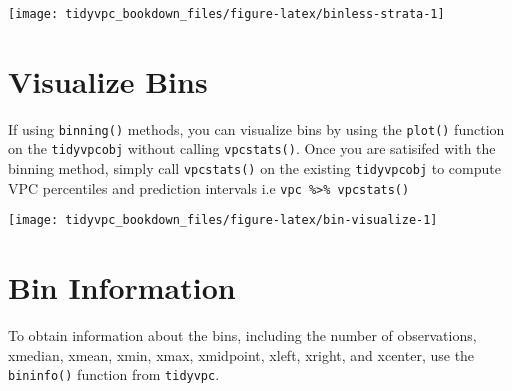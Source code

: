\documentclass[
]{book}
\newenvironment{Shaded}{\begin{snugshade}}{\end{snugshade}}
\newcommand{\DataTypeTok}[1]{\textcolor[rgb]{0.13,0.29,0.53}{#1}}
\newcommand{\DecValTok}[1]{\textcolor[rgb]{0.00,0.00,0.81}{#1}}
\newcommand{\KeywordTok}[1]{\textcolor[rgb]{0.13,0.29,0.53}{\textbf{#1}}}
\newcommand{\NormalTok}[1]{#1}
\newcommand{\OperatorTok}[1]{\textcolor[rgb]{0.81,0.36,0.00}{\textbf{#1}}}
\newcommand{\StringTok}[1]{\textcolor[rgb]{0.31,0.60,0.02}{#1}}
\begin{document}
\texttt{[image: tidyvpc\_bookdown\_files/figure-latex/binless-strata-1]}

\hypertarget{visualize-bins}{%
\section{Visualize Bins}\label{visualize-bins}}

If using \texttt{binning()} methods, you can visualize bins by using the \texttt{plot()} function on the \texttt{tidyvpcobj} without calling \texttt{vpcstats()}. Once you are satisifed with the binning method, simply call \texttt{vpcstats()} on the existing \texttt{tidyvpcobj} to compute VPC percentiles and prediction intervals i.e \texttt{vpc\ \%\textgreater{}\%\ vpcstats()}

\begin{Shaded}
\end{Shaded}

\texttt{[image: tidyvpc\_bookdown\_files/figure-latex/bin-visualize-1]}

\hypertarget{bin-information}{%
\section{Bin Information}\label{bin-information}}

To obtain information about the bins, including the number of observations, xmedian, xmean, xmin, xmax, xmidpoint, xleft, xright, and xcenter, use the \texttt{bininfo()} function from \texttt{tidyvpc}.

\begin{Shaded}
\end{Shaded}
\end{document}

